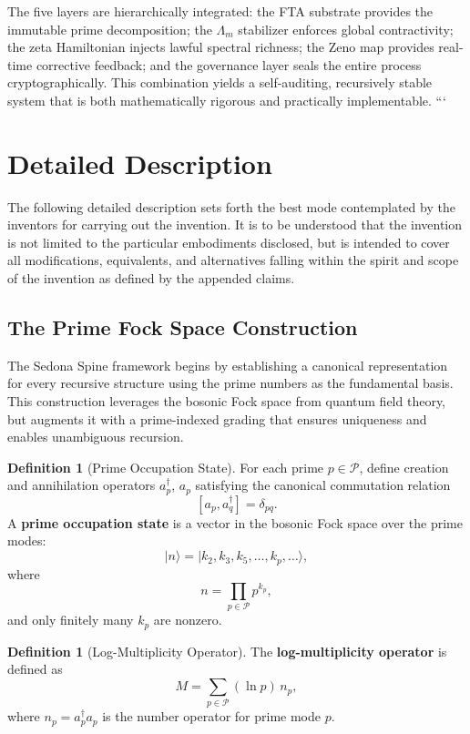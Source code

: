 \documentclass[12pt]{article}
\theoremstyle{plain}
\theoremstyle{definition}
\newtheorem{definition}[theorem]{Definition}
\theoremstyle{remark}
\begin{document}
\medskip
\noindent
The five layers are hierarchically integrated: the FTA substrate provides the immutable prime decomposition; the $\Lambda_m$ stabilizer enforces global contractivity; the zeta Hamiltonian injects lawful spectral richness; the Zeno map provides real-time corrective feedback; and the governance layer seals the entire process cryptographically. This combination yields a self-auditing, recursively stable system that is both mathematically rigorous and practically implementable.
```
\section{Detailed Description}

The following detailed description sets forth the best mode contemplated by the inventors for carrying out the invention. It is to be understood that the invention is not limited to the particular embodiments disclosed, but is intended to cover all modifications, equivalents, and alternatives falling within the spirit and scope of the invention as defined by the appended claims.

\subsection{The Prime Fock Space Construction}

The Sedona Spine framework begins by establishing a canonical representation for every recursive structure using the prime numbers as the fundamental basis. This construction leverages the bosonic Fock space from quantum field theory, but augments it with a prime-indexed grading that ensures uniqueness and enables unambiguous recursion.

\begin{definition}[Prime Occupation State]
For each prime $p \in \mathcal{P}$, define creation and annihilation operators $a_p^\dagger$, $a_p$ satisfying the canonical commutation relation
\[
[a_p, a_q^\dagger] = \delta_{pq}.
\]
A \textbf{prime occupation state} is a vector in the bosonic Fock space over the prime modes:
\[
|n\rangle = |k_2, k_3, k_5, \ldots, k_p, \ldots\rangle,
\]
where
\[
n = \prod_{p \in \mathcal{P}} p^{k_p},
\]
and only finitely many $k_p$ are nonzero.
\end{definition}

\begin{definition}[Log-Multiplicity Operator]
The \textbf{log-multiplicity operator} is defined as
\[
M = \sum_{p \in \mathcal{P}} (\ln p)\, n_p,
\]
where $n_p = a_p^\dagger a_p$ is the number operator for prime mode $p$.
\end{definition}
\end{document}
